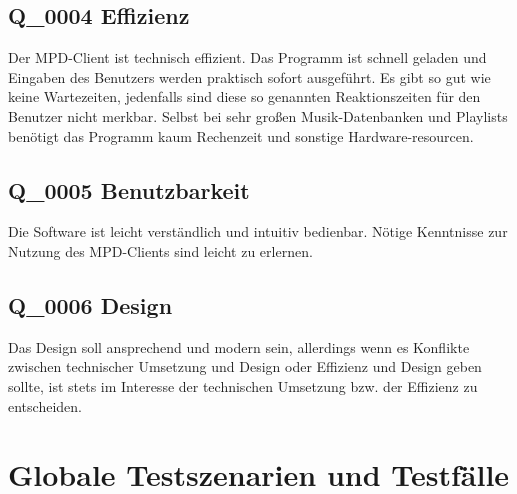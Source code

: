\subsection{Q\_0004 Effizienz}
Der MPD-Client ist technisch effizient. Das Programm ist schnell geladen und Eingaben des Benutzers
werden praktisch sofort ausgeführt. Es gibt so gut wie keine Wartezeiten, jedenfalls sind diese 
so genannten Reaktionszeiten für den Benutzer nicht merkbar. Selbst bei sehr großen Musik-Datenbanken
und Playlists benötigt das Programm kaum Rechenzeit und sonstige Hardware-resourcen.
\subsection{Q\_0005 Benutzbarkeit}
Die Software ist leicht verständlich und intuitiv bedienbar. Nötige Kenntnisse zur Nutzung des 
MPD-Clients sind leicht zu erlernen.
\subsection{Q\_0006 Design}
Das Design soll ansprechend und modern sein, allerdings wenn es Konflikte zwischen technischer Umsetzung 
und Design oder Effizienz und Design geben sollte, ist stets im Interesse der technischen Umsetzung bzw. 
der Effizienz zu entscheiden.
\section{Globale Testszenarien und Testfälle}
